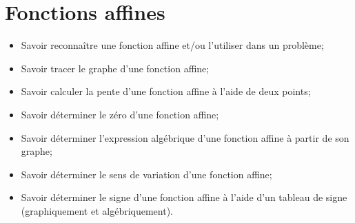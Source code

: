 \chapter{Fonctions affines}\label{ChFonctionsAffines}

\begin{acquis}
\begin{itemize}
\item Savoir reconnaître une fonction affine et/ou l’utiliser dans un problème;
\item Savoir tracer le graphe d’une fonction affine;
\item Savoir calculer la pente d’une fonction affine à l’aide de deux points;
\item Savoir déterminer le zéro d’une fonction affine;
\item Savoir déterminer l’expression algébrique d’une fonction affine à partir de son graphe;
\item Savoir déterminer le sens de variation d’une fonction affine;
\item Savoir déterminer le signe d’une fonction affine à l’aide d’un tableau de signe (graphiquement et algébriquement).
\end{itemize}
\end{acquis}

\exercicesbase
\begin{colonne*exercice}

\end{colonne*exercice}

\connaissances
%

\pagebreak



